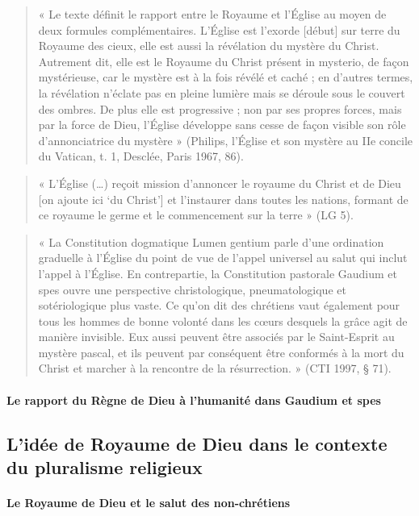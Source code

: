 \begin{quote}
    « Le texte définit le rapport entre le Royaume et l’Église au moyen de deux formules complémentaires. L’Église est l’exorde [début] sur terre du Royaume des cieux, elle est aussi la révélation du mystère du Christ. Autrement dit, elle est le Royaume du Christ présent in mysterio, de façon mystérieuse, car le mystère est à la fois révélé et caché ; en d’autres termes, la révélation n’éclate pas en pleine lumière mais se déroule sous le couvert des ombres. De plus elle est progressive ; non par ses propres forces, mais par la force de Dieu, l’Église développe sans cesse de façon visible son rôle d’annonciatrice du mystère »  (Philips, l’Église et son mystère au IIe concile du Vatican, t. 1, Desclée, Paris 1967, 86). 
\end{quote}

\begin{quote}
    « L’Église (…) reçoit mission d’annoncer le royaume du Christ et de Dieu [on ajoute ici ‘du Christ’] et l’instaurer dans toutes les nations, formant de ce royaume le germe et le commencement sur la terre » (LG 5). 
\end{quote}

\begin{quote}
    «  La Constitution dogmatique Lumen gentium parle d’une ordination graduelle à l’Église du point de vue de l’appel universel au salut qui inclut l’appel à l’Église. En contrepartie, la Constitution pastorale Gaudium et spes ouvre une perspective christologique, pneumatologique et sotériologique plus vaste. Ce qu’on dit des chrétiens vaut également pour tous les hommes de bonne volonté dans les cœurs desquels la grâce agit de manière invisible. Eux aussi peuvent être associés par le Saint-Esprit au mystère pascal, et ils peuvent par conséquent être conformés à la mort du Christ et marcher à la rencontre de la résurrection. » (CTI 1997, § 71). 
\end{quote}
\paragraph{Le rapport du Règne de Dieu à l’humanité dans Gaudium et spes }



\subsection{L’idée de Royaume de Dieu dans le contexte du pluralisme religieux}
    \paragraph{Le Royaume de Dieu et le salut des non-chrétiens } 
    
